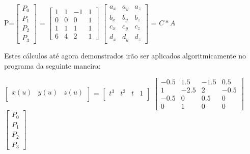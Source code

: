 P=$\begin{bmatrix}
		       P_{0}           \\[0.3em]
		       P_{1}   \\[0.3em]
		       P_{2} \\[0.3em]
		       P_{3}
		     \end{bmatrix}$ = $\begin{bmatrix}
		      					 1 & 1 & -1 & 1           \\[0.3em]
		       					 0 & 0 & 0 & 1   \\[0.3em]
		       					 1 & 1 & 1 & 1 \\[0.3em]
		      					 6 & 4 & 2 & 1
		     					\end{bmatrix}$  $\begin{bmatrix}
		       									a_{x} & a_{y} & a_{z}    \\[0.3em]
		     								  	b_{x} & b_{y} & b_{z}    \\[0.3em]
		       									c_{x} & c_{y} & c_{z}    \\[0.3em]
		       									d_{x} & d_{y} & d_{z} 
		     					\end{bmatrix}$   = $C * A$

Estes cálculos até agora demonstrados irão ser aplicados algoritmicamente no programa da seguinte maneira:

$\begin{bmatrix}
       x(u) & y(u) & z(u)           \\[0.3em]
\end{bmatrix}$ = 
$\begin{bmatrix}
       t^{3} & t^{2} & t & 1          \\[0.3em]
		\end{bmatrix}$ $\begin{bmatrix}
		      					 -0.5 & 1.5 & -1.5 & 0.5           \\[0.3em]
		       					 1 & -2.5 & 2 & -0.5   \\[0.3em]
		       					 -0.5 & 0 & 0.5 & 0 \\[0.3em]
		      					 0 & 1 & 0 & 0
		     					\end{bmatrix}$ $\begin{bmatrix}
         							    P_{0}           \\[0.3em]
       									P_{1}   \\[0.3em]
       									P_{2} \\[0.3em]
       									P_{3}
     \end{bmatrix}$